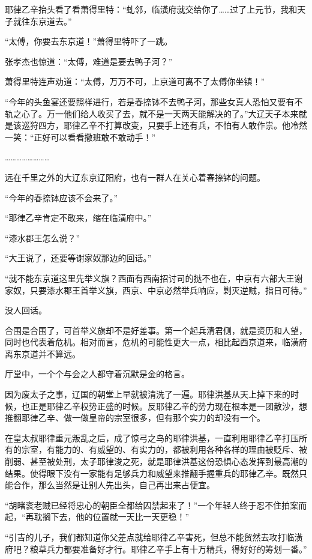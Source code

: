 耶律乙辛抬头看了看萧得里特：“虬邻，临潢府就交给你了……过了上元节，我和天子就往东京道去。”

“太傅，你要去东京道！”萧得里特吓了一跳。

张孝杰也惊道：“太傅，难道是要去鸭子河？”

萧得里特连声劝道：“太傅，万万不可，上京道可离不了太傅你坐镇！”

“今年的头鱼宴还要照样进行，若是春捺钵不去鸭子河，那些女真人恐怕又要有不轨之心了。万一他们给人收买了去，就不是一天两天能解决的了。”大辽天子本来就是该巡狩四方，耶律乙辛不打算改变，只要手上还有兵，不怕有人敢作祟。他冷然一笑：“正好可以看看撒班敢不敢动手！”

……………………

远在千里之外的大辽东京辽阳府，也有一群人在关心着春捺钵的问题。

“今年的春捺钵应该不会来了。”

“耶律乙辛肯定不敢来，缩在临潢府中。”

“漆水郡王怎么说？”

“大王说了，还要等谢家奴那边的回话。”

“就不能东京道这里先举义旗？西面有西南招讨司的挞不也在，中京有六部大王谢家奴，只要漆水郡王首举义旗，西京、中京必然举兵响应，剿灭逆贼，指日可待。”

没人回话。

合围是合围了，可首举义旗却不是好差事。第一个起兵清君侧，就是资历和人望，同时也代表着危机。相对而言，危机的可能性更大一点，相比起西京道来，临潢府离东京道并不算远。

厅堂中，一个个与会之人都守着沉默是金的格言。

因为废太子之事，辽国的朝堂上早就被清洗了一遍。耶律洪基从天上掉下来的时候，也正是耶律乙辛权势正盛的时候。反耶律乙辛的势力现在根本是一团散沙，想推翻耶律乙辛、做一做皇帝的宗室很多，但有那个实力的却没有一个。

在皇太叔耶律重元叛乱之后，成了惊弓之鸟的耶律洪基，一直利用耶律乙辛打压所有的宗室，有能力的、有威望的、有实力的，都被利用各种各样的理由被贬斥、被削弱、甚至被处刑，太子耶律浚之死，就是耶律洪基这份恐惧心态发挥到最高潮的结果。使得眼下没有一家能有足够兵力和威望来推翻手握重兵的耶律乙辛。既然只能合作，那么当然是让别人先出头，自己再出来占便宜。

“胡睹衮老贼已经将忠心的朝臣全都给囚禁起来了！”一个年轻人终于忍不住拍案而起，“再耽搁下去，他的位置就一天比一天更稳！”

“引吉的儿子，我们都知道你父差点就给耶律乙辛害死，但总不能贸然去攻打临潢府吧？粮草兵力都要准备好才行。耶律乙辛手上有十万精兵，得好好的筹划一番。”

